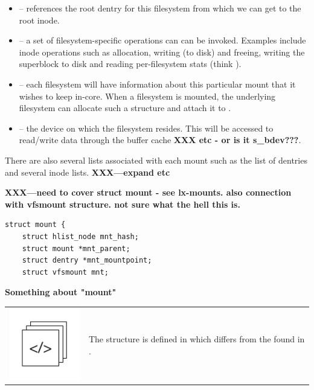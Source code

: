 \begin{itemize}
	\item {} -- references the root dentry for this filesystem from which we can get to the root inode.
	\item {} -- a set of filesystem-specific operations can can be invoked. Examples include
		inode operations such as allocation, writing (to disk) and freeing, writing the superblock to disk
		and reading per-filesystem stats (think ).
	\item {} -- each filesystem will have information about this particular mount that it wishes to
		keep in-core. When a filesystem is mounted, the underlying filesystem can allocate such a structure
		and attach it to .
	\item {} -- the device on which the filesystem resides. This will be accessed to read/write data
		through the buffer cache {\bfseries XXX etc - or is it s\_bdev???}.
\end{itemize}

\noindent
There are also several lists associated with each mount such as the list of dentries and several inode lists. {\bfseries XXX---expand etc}

\textbf{XXX---need to cover struct mount - see lx-mounts. also connection with vfsmount structure. not sure what the hell this is.}

\begin{lstlisting}
struct mount {
    struct hlist_node mnt_hash;
    struct mount *mnt_parent;
    struct dentry *mnt_mountpoint;
    struct vfsmount mnt;
\end{lstlisting}

\noindent
\textbf{Something about "mount"}

\begin{table}[h]
\begin{tabular}{ll}
\parbox[l]{0.6in}{\includegraphics[scale=0.8]{figures/src-xref.pdf}} & \parbox[l]{4in}{\small{The  structure is defined in  which differs from the  found in .}}
\end{tabular}
\end{table}

